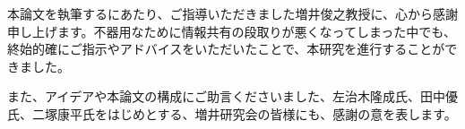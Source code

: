 \begin{acknowledgment}

    本論文を執筆するにあたり、ご指導いただきました増井俊之教授に、心から感謝申し上げます。不器用なために情報共有の段取りが悪くなってしまった中でも、終始的確にご指示やアドバイスをいただいたことで、本研究を進行することができました。
    
    また、アイデアや本論文の構成にご助言くださいました、左治木隆成氏、田中優氏、二塚康平氏をはじめとする、増井研究会の皆様にも、感謝の意を表します。

\end{acknowledgment}
